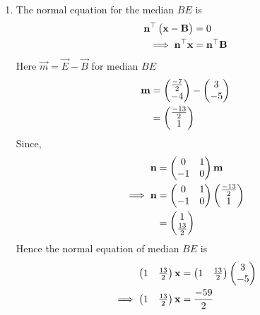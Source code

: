 \documentclass[11pt]{book}
\begin{document}
\begin{enumerate}[label=\thesection.\arabic*.,ref=\thesection.\theenumi]
\begin{enumerate}
\item The normal equation for the median $BE$ is
\begin{align}
\mathbf{n}^{\top}\begin{pmatrix}\mathbf{x}-\mathbf{B}\end{pmatrix}&=0\\
\implies
\mathbf{n}^{\top}\mathbf{x}&=\mathbf{n}^{\top}\mathbf{B}
\end{align}
Here $\vec{m} = \vec{E}- \vec{B}$ for median $BE$
\begin{align}
\mathbf{m}&=\begin{pmatrix}\frac{-7}{2}\\-4\end{pmatrix} - \begin{pmatrix}3\\-5\end{pmatrix}\\
       &=\begin{pmatrix}\frac{-13}{2}\\1\end{pmatrix}
\end{align}
Since,
\begin{align}
  \mathbf{n} &= \begin{pmatrix}0 & 1\\
  -1 & 0\end{pmatrix}\mathbf{m}\\
\implies
\mathbf{n} &= \begin{pmatrix}0 & 1\\
  -1 & 0\end{pmatrix}\begin{pmatrix}\frac{-13}{2}\\1\end{pmatrix}\\
        &= \begin{pmatrix}1\\ \frac{13}{2}\end{pmatrix}
\end{align}
Hence the normal equation of median $BE$ is 
\begin{align}
    \begin{pmatrix}1 & \frac{13}{2}\end{pmatrix}\mathbf{x}&=\begin{pmatrix}1 & \frac{13}{2}\end{pmatrix}\begin{pmatrix}3\\-5\end{pmatrix}\\
\implies
    \begin{pmatrix}1 & \frac{13}{2}\end{pmatrix}\mathbf{x}&=\frac{-59}{2}
\end{align}


\end{enumerate}
\end{enumerate}
\end{document}
